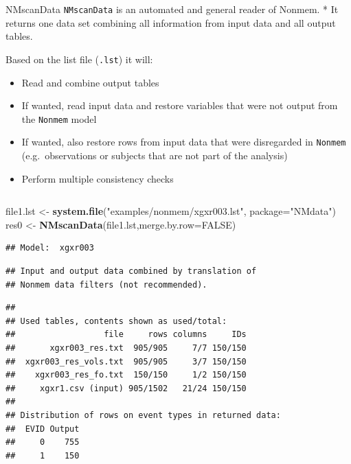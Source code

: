 \documentclass[
  8pt,
  ignorenonframetext,
  aspectratio=169]{beamer}
\newenvironment{Shaded}{\begin{snugshade}}{\end{snugshade}}
\newcommand{\DataTypeTok}[1]{\textcolor[rgb]{0.13,0.29,0.53}{#1}}
\newcommand{\KeywordTok}[1]{\textcolor[rgb]{0.13,0.29,0.53}{\textbf{#1}}}
\newcommand{\NormalTok}[1]{#1}
\newcommand{\OtherTok}[1]{\textcolor[rgb]{0.56,0.35,0.01}{#1}}
\newcommand{\StringTok}[1]{\textcolor[rgb]{0.31,0.60,0.02}{#1}}
\providecommand{\tightlist}{%
  \setlength{\itemsep}{0pt}\setlength{\parskip}{0pt}}
\begin{document}
\begin{frame}[fragile]{NMscanData}
\protect\hypertarget{nmscandata}{}
\texttt{NMscanData} is an automated and general reader of Nonmem. * It
returns one data set combining all information from input data and all
output tables.

Based on the list file (\texttt{.lst}) it will:

\begin{itemize}
\tightlist
\item
  Read and combine output tables
\item
  If wanted, read input data and restore variables that were not output
  from the \texttt{Nonmem} model
\item
  If wanted, also restore rows from input data that were disregarded in
  \texttt{Nonmem} (e.g.~observations or subjects that are not part of
  the analysis)
\item
  Perform multiple consistency checks
\end{itemize}

\pause
\footnotesize

\begin{columns}[T]
\begin{column}{0.48\textwidth}
\begin{Shaded}
\begin{Highlighting}[]
\NormalTok{file1.lst \textless{}{-}}\StringTok{ }\KeywordTok{system.file}\NormalTok{(}\StringTok{"examples/nonmem/xgxr003.lst"}\NormalTok{,}
                         \DataTypeTok{package=}\StringTok{"NMdata"}\NormalTok{)}
\NormalTok{res0 \textless{}{-}}\StringTok{ }\KeywordTok{NMscanData}\NormalTok{(file1.lst,}\DataTypeTok{merge.by.row=}\OtherTok{FALSE}\NormalTok{)}
\end{Highlighting}
\end{Shaded}

\begin{verbatim}
## Model:  xgxr003
\end{verbatim}

\begin{verbatim}
## Input and output data combined by translation of
## Nonmem data filters (not recommended).
\end{verbatim}

\begin{verbatim}
## 
## Used tables, contents shown as used/total:
##                  file     rows columns     IDs
##       xgxr003_res.txt  905/905     7/7 150/150
##  xgxr003_res_vols.txt  905/905     3/7 150/150
##    xgxr003_res_fo.txt  150/150     1/2 150/150
##     xgxr1.csv (input) 905/1502   21/24 150/150
## 
## Distribution of rows on event types in returned data:
##  EVID Output
##     0    755
##     1    150
\end{verbatim}
\end{column}


\end{columns}
\end{frame}
\end{document}
